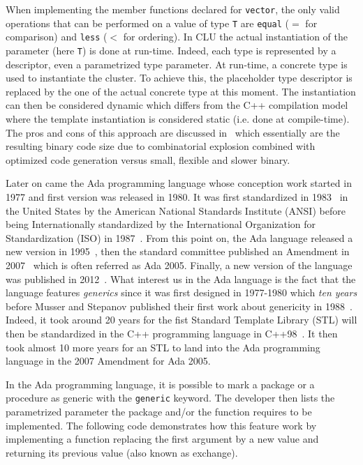 When implementing the member functions declared for \texttt{vector}, the only valid operations that can be performed on
a value of type \texttt{T} are \texttt{equal} ($=$ for comparison) and \texttt{less} ($<$ for ordering). In CLU the
actual instantiation of the parameter (here \texttt{T}) is done at run-time. Indeed, each type is represented by a
descriptor, even a parametrized type parameter. At run-time, a concrete type is used to instantiate the cluster. To
achieve this, the placeholder type descriptor is replaced by the one of the actual concrete type at this moment. The
instantiation can then be considered dynamic which differs from the C++ compilation model where the template
instantiation is considered static (i.e. done at compile-time). The pros and cons of this approach are discussed
in~\parencite{atkinson.1978.cluimpl} which essentially are the resulting binary code size due to combinatorial explosion
combined with optimized code generation versus small, flexible and slower binary.

Later on came the Ada programming language whose conception work started in 1977 and first version was released in 1980.
It was first standardized in 1983~\parencite{ansi.1983.ada} in the United States by the American National Standards
Institute (ANSI) before being Internationally standardized by the International Organization for Standardization (ISO)
in 1987~\parencite{iso.1987.ada}. From this point on, the Ada language released a new version in
1995~\parencite{iso.1995.ada, iso.1995.ada.corr}, then the standard committee published an Amendment in
2007~\parencite{iso.1995.ada.amend} which is often referred as Ada 2005. Finally, a new version of the language was
published in 2012~\parencite{iso.2012.ada,iso.2012.ada.corr}. What interest us in the Ada language is the fact that the
language features \emph{generics} since it was first designed in 1977-1980 which \emph{ten years} before Musser and
Stepanov published their first work about genericity in 1988~\parencite{musser.1988.generic}. Indeed, it took around 20
years for the fist Standard Template Library (STL) will then be standardized in the C++ programming language in
C++98~\parencite{iso.1998.cpp}. It then took almost 10 more years for an STL to land into the Ada programming language in
the 2007 Amendment for Ada 2005.

In the Ada programming language, it is possible to mark a package or a procedure as generic with the \texttt{generic}
keyword. The developer then lists the parametrized parameter the package and/or the function requires to be implemented.
The following code demonstrates how this feature work by implementing a function replacing the first argument by a new
value and returning its previous value (also known as exchange).

